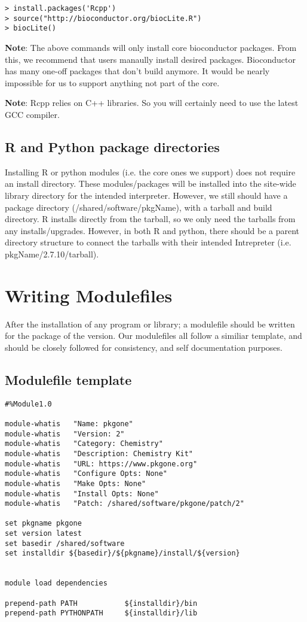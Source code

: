 \documentclass{article}
\begin{document}
\begin{verbatim}
> install.packages('Rcpp')
> source("http://bioconductor.org/biocLite.R")
> biocLite()
\end{verbatim}

\textbf{Note}: The above commands will only install core bioconductor packages.  
From this, we recommend that users manaully install desired packages.  
Bioconductor has many one-off packages that don't build anymore.  It would be 
nearly impossible for us to support anything not part of the core.

\textbf{Note}: Rcpp relies on C++ libraries.  So you will certainly need to use 
the latest GCC compiler.

\subsection{R and Python package directories}

Installing R or python modules (i.e. the core ones we support) does not require 
an install directory.  These modules/packages will be installed into the 
site-wide library directory for the intended interpreter.  However, we still 
should have a package directory (/shared/software/pkgName), with a tarball and 
build directory.  R installs directly from the tarball, so we only need the 
tarballs from any installs/upgrades.  However, in both R and python, there 
should be a parent directory structure to connect the tarballs with their 
intended Intrepreter (i.e. pkgName/2.7.10/tarball).

\section{Writing Modulefiles}

After the installation of any program or library; a modulefile should be 
written for the package of the version.  Our modulefiles all follow a similiar 
template, and should be closely followed for consistency, and self 
documentation purposes.

\subsection{Modulefile template}

\begin{verbatim}
#%Module1.0

module-whatis	"Name: pkgone"
module-whatis	"Version: 2"
module-whatis	"Category: Chemistry"
module-whatis	"Description: Chemistry Kit"
module-whatis	"URL: https://www.pkgone.org"
module-whatis 	"Configure Opts: None"
module-whatis 	"Make Opts: None"
module-whatis 	"Install Opts: None"
module-whatis 	"Patch: /shared/software/pkgone/patch/2"

set pkgname pkgone
set version latest
set basedir /shared/software
set installdir ${basedir}/${pkgname}/install/${version}


module load dependencies

prepend-path PATH           ${installdir}/bin
prepend-path PYTHONPATH     ${installdir}/lib
\end{verbatim}
\end{document}
